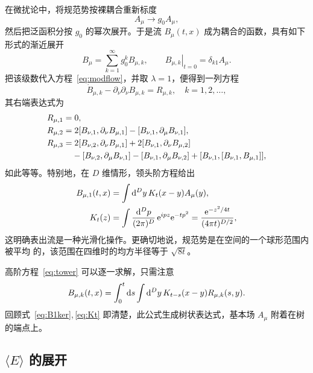 在微扰论中，将规范势按裸耦合重新标度
\begin{equation}
  A_{\mu}\to g_0A_{\mu},
\end{equation}
然后把泛函积分按 $g_0$ 的幂次展开。于是流 $B_{\mu}(t,x)$ 成为耦合的函数，具有如下
形式的渐近展开
\begin{equation}
  B_{\mu}=\sum_{k=1}^{\infty}g_0^kB_{\mu,k},
  \qquad
  \left.B_{\mu,k}\right|_{t=0}=\delta_{k1}A_{\mu}.
  \label{eq:Bseries}
\end{equation}
把该级数代入方程~\eqref{eq:modflow}，并取 $\lambda=1$，便得到一列方程
\begin{equation}
  \dot{B}_{\mu,k}-\partial_{\nu}\partial_{\nu}B_{\mu,k}=
  R_{\mu,k},
  \quad k=1,2,\ldots,
  \label{eq:tower}
\end{equation}
其右端表达式为
\begin{align}
  R_{\mu,1}&=0,
  \\
  R_{\mu,2}&=2[B_{\nu,1},\partial_{\nu}B_{\mu,1}]
            -[B_{\nu,1},\partial_{\mu}B_{\nu,1}],
  \\
  R_{\mu,3}&=2[B_{\nu,2},\partial_{\nu}B_{\mu,1}]
            +2[B_{\nu,1},\partial_{\nu}B_{\mu,2}]
            \nonumber\\
  &\hphantom{{}=}
            -[B_{\nu,2},\partial_{\mu}B_{\nu,1}]
            -[B_{\nu,1},\partial_{\mu}B_{\nu,2}]
            +[B_{\nu,1},[B_{\nu,1},B_{\mu,1}]],
\end{align}
如此等等。特别地，在 $D$ 维情形，领头阶方程给出
\begin{align}
  B_{\mu,1}(t,x)&=\int\mathrm{d}^Dy\,K_t(x-y)A_{\mu}(y),
  \label{eq:B1ker}\\
  K_t(z)&=\int{\mathrm{d}^Dp\over(2\pi)^D}\,\mathrm{e}^{ipz}\mathrm{e}^{-tp^2}=
  {\mathrm{e}^{-z^2/4t}\over(4\pi t)^{D/2}},
  \label{eq:Kt}
\end{align}
这明确表出流是一种光滑化操作。更确切地说，规范势是在空间的一个球形范围内被平均
的，该范围在四维时的均方半径等于 $\sqrt{8t}$。

高阶方程~\eqref{eq:tower} 可以逐一求解，只需注意
\begin{equation}
   B_{\mu,k}(t,x)=\int_0^t\mathrm{d} s\int\mathrm{d}^Dy\,K_{t-s}(x-y)R_{\mu,k}(s,y).
   \label{eq:Bksol}
\end{equation}
回顾式~\eqref{eq:B1ker},\,\eqref{eq:Kt} 即清楚，此公式生成树状表达式，基本场
$A_{\mu}$ 附着在树的端点上。


\subsection{$\langle E\rangle$ 的展开}

